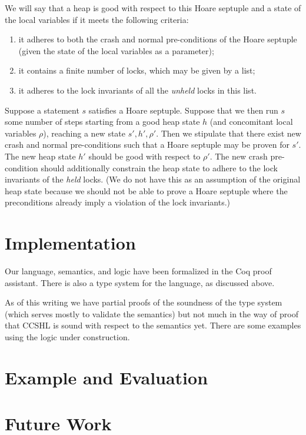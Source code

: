 We will say that a heap is good with respect to this Hoare septuple
and a state of the local variables
if it meets the following criteria:
\begin{enumerate}
\item it adheres to both the crash and normal pre-conditions
of the Hoare septuple
(given the state of the local variables as a parameter);
\item it contains a finite number of locks, which may be given by a list;
\item it adheres to the lock invariants of all the \emph{unheld} locks
in this list.
\end{enumerate}
Suppose a statement $s$ satisfies a Hoare septuple.
Suppose that we then run $s$ some number of steps starting from
a good heap state $h$ (and concomitant local variables $\rho$),
reaching a new state $s', h', \rho'$.
Then we stipulate that there exist new crash and normal pre-conditions
such that a Hoare septuple may be proven for $s'$.
The new heap state $h'$ should be good with respect to $\rho'$.
The new crash pre-condition should additionally constrain the heap state
to adhere to the lock invariants of the \emph{held} locks.
(We do not have this as an assumption of the original heap state because
we should not be able to prove a Hoare septuple where the preconditions
already imply a violation of the lock invariants.)

\section{Implementation}
\label{sec:imp}

Our language, semantics, and logic have been formalized in the Coq
proof assistant.
There is also a type system for the language, as discussed above.

As of this writing we have partial proofs of the soundness of the type
system (which serves mostly to validate the semantics) but not much in
the way of proof that CCSHL is sound with respect to the semantics yet.
There are some examples using the logic under construction.


\section{Example and Evaluation}
\label{sec:eval}



\section{Future Work}
\label{sec:future}

